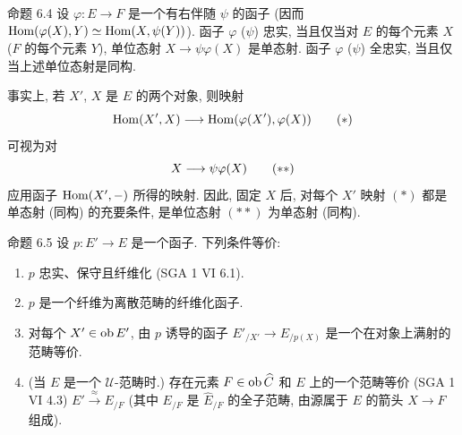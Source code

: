 \begin{enonce*}{命题 6.4}
设 $\varphi:E\rightarrow F$ 是一个有右伴随 $\psi$ 的函子
(因而 $\operatorname{Hom}(\varphi(X),Y)\simeq \operatorname{Hom}(X,\psi(Y))$).
函子 $\varphi$ (\resp $\psi$) 忠实,
当且仅当对 $E$ 的每个元素 $X$ (\resp $F$ 的每个元素 $Y$),
单位态射 $X\rightarrow \psi\varphi(X)$ 是单态射.
函子 $\varphi$ (\resp $\psi$) 全忠实,
当且仅当上述单位态射是同构.
\end{enonce*}
事实上, 若 $X'$, $X$ 是 $E$ 的两个对象, 则映射
\begin{equation*}
\operatorname{Hom}(X',X)\longrightarrow
  \operatorname{Hom}(\varphi(X'),\varphi(X))\tag{$\ast$}
\end{equation*}
可视为对
\begin{equation*}
X\longrightarrow \psi
  \varphi (X)\tag{${\ast}{\ast}$}
\end{equation*}
应用函子 $\operatorname{Hom}(X',-)$ 所得的映射.
因此, 固定 $X$ 后, 对每个 $X'$ 映射 $(\ast)$ 都是单态射\pageoriginale
(\resp 同构) 的充要条件, 是单位态射 $({\ast}{\ast})$ 为单态射
(\resp 同构).

\begin{enonce*}{命题 6.5}
设 $p:E'\rightarrow E$ 是一个函子. 下列条件等价:
\begin{enumerate}
\renewcommand{\theenumi}{\roman{enumi}}
\renewcommand{\labelenumi}{(\theenumi)}
\item $p$ 忠实、保守且纤维化 {\rm(SGA 1 VI 6.1).}

\item $p$ 是一个纤维为离散范畴的纤维化函子.

\item 对每个 $X'\in \operatorname{ob} E'$, 由 $p$ 诱导的函子 $E'_{/X'}\rightarrow
  E_{/p(X)}$ 是一个在对象上满射的范畴等价.

\item (当 $E$ 是一个 $𝒰$-范畴时.) 存在元素
  $F\in \operatorname{ob}\widehat{C}$ 和 $E$ 上的一个范畴等价
  {\rm(SGA 1 VI 4.3)} $E'\xrightarrow{\approx}E_{/F}$
  (其中 $E_{/F}$ 是 $\widehat{E}_{/F}$ 的全子范畴,
  由源属于 $E$ 的箭头 $X\rightarrow F$ 组成).
\end{enumerate}
\end{enonce*}

\setcounter{subsection}{5} \setcounter{subsubsection}{0}



